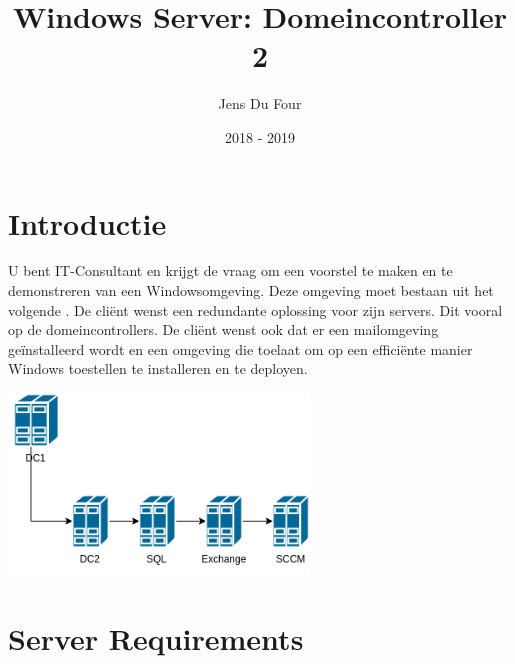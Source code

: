 \documentclass[a4paper]{article}
\title{Windows Server: Domeincontroller 2}
\author{Jens Du Four}
\date{2018 - 2019}
\begin{document}
\maketitle

\section{Introductie}
U bent IT-Consultant en krijgt de vraag om een voorstel te maken en te demonstreren van een Windowsomgeving. Deze omgeving moet bestaan uit het volgende . De cliënt wenst een redundante oplossing voor zijn servers. Dit vooral op de domeincontrollers. De cliënt wenst ook dat er een mailomgeving geïnstalleerd wordt en een omgeving die toelaat om op een efficiënte manier Windows toestellen te installeren en te deployen.

\begin{center}
\includegraphics[width=8cm]{Netwerkdiagram.png}
\end{center}

\section{Server Requirements}
\end{document}
